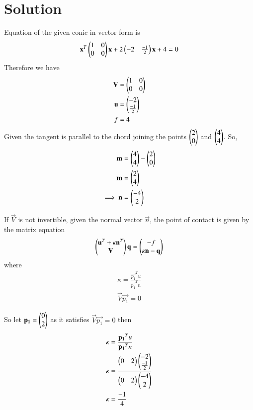 \documentclass[journal,12pt,twocolumn]{IEEEtran}
\begin{document}
\section{Solution}
Equation of the given conic in vector form is 
\begin{align}
    \mathbf{x}^T\begin{pmatrix}1 &0\\0 &0\end{pmatrix}\mathbf{x}+2\begin{pmatrix}-2 &\frac{-1}{2}\end{pmatrix}\mathbf{x}+4=0 \label{a}
\end{align}
Therefore we have
\begin{align}
    \mathbf{V} &= \begin{pmatrix}1 &0\\0 &0\end{pmatrix}\\
    \mathbf{u} &= \begin{pmatrix}-2 \\ \frac{-1}{2}\end{pmatrix}\\
    f &= 4
\end{align}
Given the tangent is parallel to the chord joining the points $\begin{pmatrix}2\\0\end{pmatrix}$ and $\begin{pmatrix}4\\4\end{pmatrix}$. So,
\begin{align}
    \mathbf{m} &= \begin{pmatrix}4\\4\end{pmatrix} - \begin{pmatrix}2\\0\end{pmatrix}\\
    \mathbf{m} &= \begin{pmatrix}2\\4\end{pmatrix}\\
    \implies \mathbf{n} &= \begin{pmatrix}-4\\2\end{pmatrix}
\end{align}
\begin{lemma}
If $\vec{V}$ is not invertible, given the normal vector $\vec{n}$, the point of contact is given by the matrix equation
\begin{align}
    \begin{pmatrix}\mathbf{u}^T+\kappa\mathbf{n}^T\\\mathbf{V}\end{pmatrix}\mathbf{q} = \begin{pmatrix}-f\\ \kappa\mathbf{n}-\mathbf{q}\end{pmatrix} 
\end{align} 
where
\begin{align}
    \kappa = \frac{\vec{p_1}^Tu}{\vec{p_1}^Tn}\\
    \vec{V}\vec{p_1}=0
\end{align}
\end{lemma}
So let $\mathbf{p_1} = \begin{pmatrix}0\\2\end{pmatrix}$ as it satisfies $\vec{V}\vec{p_1}=0$ then
\begin{align}
    \kappa &= \frac{\mathbf{p_1}^Tu}{\mathbf{p_1}^Tn}\\
    \kappa &= \frac{\begin{pmatrix}0 &2\end{pmatrix}\begin{pmatrix}-2\\\frac{-1}{2}\end{pmatrix}}{\begin{pmatrix}0 &2\end{pmatrix}\begin{pmatrix}-4\\2\end{pmatrix}}\\
    \kappa &= \frac{-1}{4}
\end{align}
\end{document}
